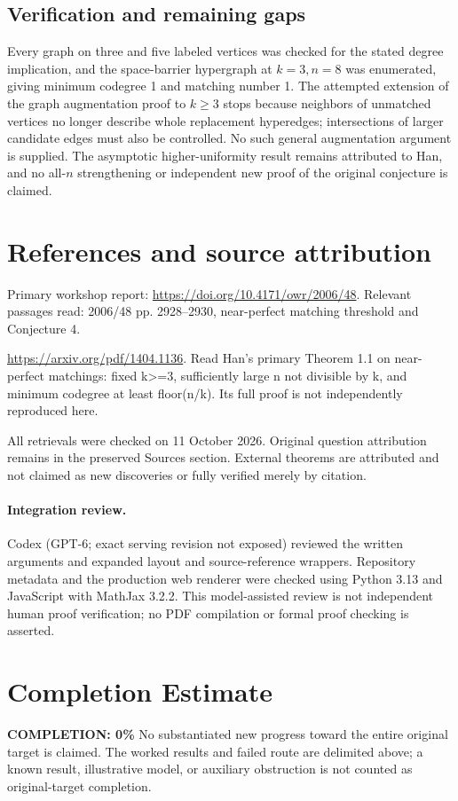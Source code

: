 \documentclass[11pt]{article}
\begin{document}
\subsection{Verification and remaining gaps}
Every graph on three and five labeled vertices was checked for the stated degree implication, and the space-barrier hypergraph at $k=3,n=8$ was enumerated, giving minimum codegree 1 and matching number 1. The attempted extension of the graph augmentation proof to $k\ge3$ stops because neighbors of unmatched vertices no longer describe whole replacement hyperedges; intersections of larger candidate edges must also be controlled. No such general augmentation argument is supplied. The asymptotic higher-uniformity result remains attributed to Han, and no all-$n$ strengthening or independent new proof of the original conjecture is claimed.

\section{References and source attribution}
Primary workshop report: \url{https://doi.org/10.4171/owr/2006/48}. Relevant passages read: 2006/48 pp. 2928--2930, near-perfect matching threshold and Conjecture 4.

\url{https://arxiv.org/pdf/1404.1136}. Read Han’s primary Theorem 1.1 on near-perfect matchings: fixed k>=3, sufficiently large n not divisible by k, and minimum codegree at least floor(n/k). Its full proof is not independently reproduced here.

All retrievals were checked on 11 October 2026. Original question attribution remains in the preserved Sources section. External theorems are attributed and not claimed as new discoveries or fully verified merely by citation.


\paragraph{Integration review.} Codex (GPT-6; exact serving revision not exposed) reviewed the written arguments and expanded layout and source-reference wrappers. Repository metadata and the production web renderer were checked using Python 3.13 and JavaScript with MathJax 3.2.2. This model-assisted review is not independent human proof verification; no PDF compilation or formal proof checking is asserted.

\section{Completion Estimate}
\noindent\textbf{COMPLETION: 0\%}
No substantiated new progress toward the entire original target is claimed. The worked results and failed route are delimited above; a known result, illustrative model, or auxiliary obstruction is not counted as original-target completion.
\end{document}
